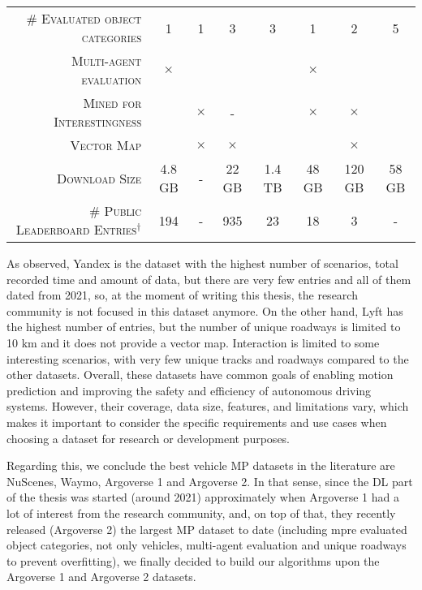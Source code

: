 \begin{table}[!tpbh]
\begin{adjustbox}{max width=\columnwidth}
\begin{tabular}{rccccccc}
			\textsc{\# Evaluated object categories} & 1 & 1 & 3 & 3 & 1 & 2 & 5 \\
			\textsc{Multi-agent evaluation} & $\times$ & \checkmark & \checkmark & \checkmark & $\times$ & \checkmark &\checkmark \\
			\textsc{Mined for Interestingness} & \checkmark & $\times$ & - & \checkmark & $\times$ & $\times$ & \checkmark \\
			\textsc{Vector Map} & \checkmark & $\times$ & $\times$ & \checkmark & \checkmark & $\times$ &\checkmark \\
			\textsc{Download Size} & 4.8 GB  & -  & 22 GB  & 1.4 TB  & 48 GB & 120 GB & 58 GB \\
			\textsc{\# Public Leaderboard Entries}$^\dagger$ & 194  & -  & 935  & 23 & 18 & 3 & - \\
			\bottomrule
		\end{tabular}
		\endgroup
	\end{adjustbox}
\end{table}

As observed, Yandex is the dataset with the highest number of scenarios, total recorded time and amount of data, but there are very few entries and all of them dated from 2021, so, at the moment of writing this thesis, the research community is not focused in this dataset anymore. On the other hand, Lyft has the highest number of entries, but the number of unique roadways is limited to 10 km and it does not provide a vector map. Interaction is limited to some interesting scenarios, with very few unique tracks and roadways compared to the other datasets. Overall, these datasets have common goals of enabling motion prediction and improving the safety and efficiency of autonomous driving systems. However, their coverage, data size, features, and limitations vary, which makes it important to consider the specific requirements and use cases when choosing a dataset for research or development purposes. 

Regarding this, we conclude the best vehicle \ac{MP} datasets in the literature are NuScenes, Waymo, Argoverse 1 and Argoverse 2. In that sense, since the \ac{DL} part of the thesis was started (around 2021) approximately when Argoverse 1 had a lot of interest from the research community, and, on top of that, they recently released (Argoverse 2) the largest \ac{MP} dataset to date (including mpre evaluated object categories, not only vehicles, multi-agent evaluation and unique roadways to prevent overfitting), we finally decided to build our algorithms upon the Argoverse 1 and Argoverse 2 datasets.

